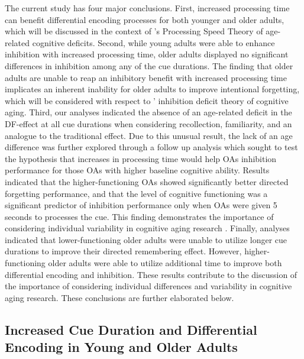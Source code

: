 \documentclass[man]{apa6}
\begin{document}
The current study has four major conclusions. First, increased processing time can benefit differential encoding processes for both younger and older adults, which will be discussed in the context of \textcite{salthouse1996}'s Processing Speed Theory of age-related cognitive deficits. Second, while young adults were able to enhance inhibition with increased processing time, older adults displayed no significant differences in inhibition among any of the cue durations. The finding that older adults are unable to reap an inhibitory benefit with increased processing time implicates an inherent inability for older adults to improve intentional forgetting, which will be considered with respect to \textcite{hasher.zacks1988}' inhibition deficit theory of cognitive aging. Third, our analyses indicated the absence of an age-related deficit in the DF-effect at all cue durations when considering recollection, familiarity, and an analogue to the traditional effect. Due to this unusual result, the lack of an age difference was further explored through a follow up analysis which sought to test the hypothesis that increases in processing time would help OAs inhibition performance for those OAs with higher baseline cognitive ability. Results indicated that the higher-functioning OAs showed significantly better directed forgetting performance, and that the level of cognitive functioning was a significant predictor of inhibition performance only when OAs were given 5 seconds to processes the cue. This finding demonstrates the importance of considering individual variability in cognitive aging research \parencite{nelson.dannefer1992, christensen.et.al1994, morse1993,shammi.bosman.stuss1998,  christensen.et.al1999, anstey.christensen2000,  christensen2001}. Finally, analyses indicated that lower-functioning older adults were unable to utilize longer cue durations to improve their directed remembering effect. However, higher-functioning older adults were able to utilize additional time to improve both differential encoding and inhibition. These results contribute to the discussion of the importance of considering individual differences and variability in cognitive aging research. These conclusions are further elaborated below.

\subsection*{Increased Cue Duration and Differential Encoding in Young and Older Adults}
\end{document}
